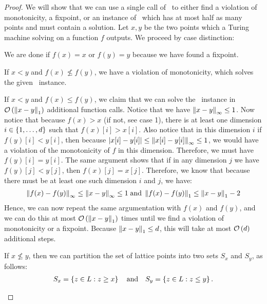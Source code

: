 \begin{proof}
    We will show that we can use a single call of \Tarskistar\ to either find a violation of monotonicity, a fixpoint, or an instance of \Tarski\, which has at most half as many points and must contain a solution. Let $x, y$ be the two points which a Turing machine solving \Tarskistar on a function $f$ outputs. We proceed by case distinction:
    \begin{case}{1}
        We are done if $f(x) = x$ or $f(y) = y$ because we have found a fixpoint.
    \end{case}
    \begin{case}{2.1}
        If $x < y$ and $f(x) \not\leq f(y)$, we have a violation of monotonicity, which solves the given \Tarski\ instance.
    \end{case}
    \begin{case}{2.2}
        If $x < y$ and $f(x) \leq f(y)$, we claim that we can solve the \Tarski\ instance in $\mathcal{O}\left(\left\lVert x - y\right\rVert_{1}\right)$ additional function calls. Notice that we have $\left\lVert x-y\right\rVert_{\infty} \leq 1$. Now notice that because $f(x) > x$ (if not, see case 1), there is at least one dimension $i \in \left\{1, \dots, d\right\}$ such that $f(x)[i] > x[i]$. Also notice that in this dimension $i$ if $f(y)[i] < y[i]$, then because $\left\lvert x[i] - y[i]\right\rvert \leq \left\lVert x[i] - y[i]\right\rVert_{\infty} \leq 1$, we would have a violation of the monotonicity of $f$ in this dimension. Therefore, we must have $f(y)[i] = y[i]$. The same argument shows that if in any dimension $j$ we have $f(y)[j] < y[j]$, then $f(x)[j] = x[j]$. Therefore, we know that because there must be at least one such dimension $i$ and $j$, we have:
        \begin{align*}
            \left\lVert f(x) - f(y)\right\rVert_{\infty} \leq \left\lVert x - y\right\rVert_{\infty} \leq 1 \; \text{and} \; \left\lVert f(x) - f(y)\right\rVert_{1} \leq \left\lVert x - y\right\rVert_{1} - 2
        \end{align*}
        Hence, we can now repeat the same argumentation with $f(x)$ and $f(y)$, and we can do this at most $\mathcal{O}\left(\left\lVert x - y\right\rVert_{1}\right)$ times until we find a violation of monotonicity or a fixpoint. Because $\left\lVert x - y\right\rVert_{1} \leq d$, this will take at most $\mathcal{O}\left(d\right)$ additional steps.
    \end{case}
    \begin{case}{3}
        If $x \not\leq y$, then we can partition the set of lattice points into two sets $S_x$ and $S_y$, as follows:
        \begin{align*}
            S_x = \left\{z \in L : z \geq x\right\} \quad \text{and} \quad S_y = \left\{z \in L : z \leq y\right\}.
        \end{align*}

\end{case}
\end{proof}
